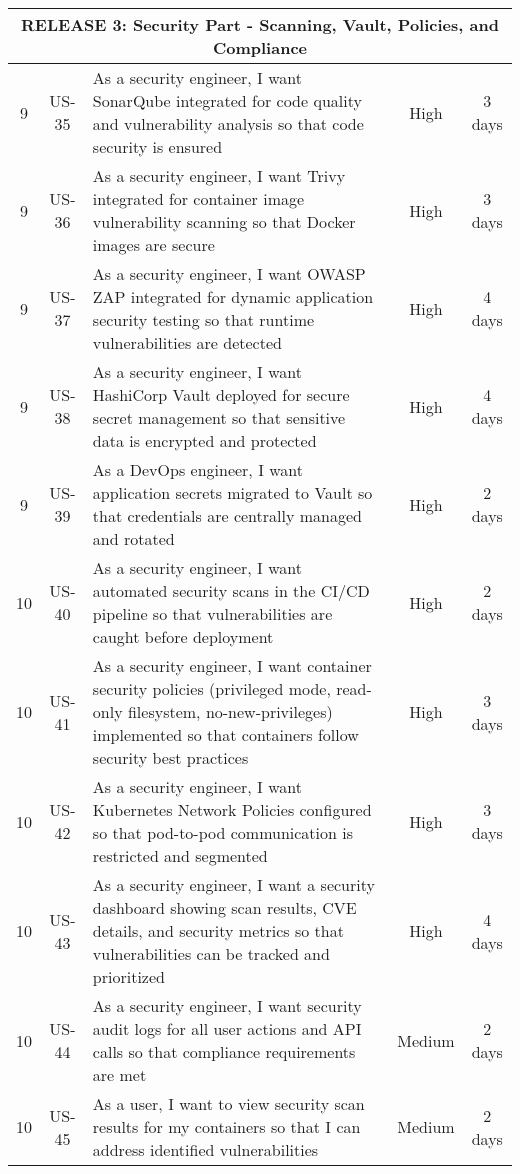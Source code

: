 \begin{longtable}{|c|c|p{8cm}|c|c|}
\multicolumn{5}{|c|}{\cellcolor{red!25}\textbf{RELEASE 3: Security Part - Scanning, Vault, Policies, and Compliance}} \\
\hline

9 & US-35 & As a security engineer, I want SonarQube integrated for code quality and vulnerability analysis so that code security is ensured & High & 3 days \\ \hline
9 & US-36 & As a security engineer, I want Trivy integrated for container image vulnerability scanning so that Docker images are secure & High & 3 days \\ \hline
9 & US-37 & As a security engineer, I want OWASP ZAP integrated for dynamic application security testing so that runtime vulnerabilities are detected & High & 4 days \\ \hline
9 & US-38 & As a security engineer, I want HashiCorp Vault deployed for secure secret management so that sensitive data is encrypted and protected & High & 4 days \\ \hline
9 & US-39 & As a DevOps engineer, I want application secrets migrated to Vault so that credentials are centrally managed and rotated & High & 2 days \\ \hline

10 & US-40 & As a security engineer, I want automated security scans in the CI/CD pipeline so that vulnerabilities are caught before deployment & High & 2 days \\ \hline
10 & US-41 & As a security engineer, I want container security policies (privileged mode, read-only filesystem, no-new-privileges) implemented so that containers follow security best practices & High & 3 days \\ \hline
10 & US-42 & As a security engineer, I want Kubernetes Network Policies configured so that pod-to-pod communication is restricted and segmented & High & 3 days \\ \hline
10 & US-43 & As a security engineer, I want a security dashboard showing scan results, CVE details, and security metrics so that vulnerabilities can be tracked and prioritized & High & 4 days \\ \hline
10 & US-44 & As a security engineer, I want security audit logs for all user actions and API calls so that compliance requirements are met & Medium & 2 days \\ \hline
10 & US-45 & As a user, I want to view security scan results for my containers so that I can address identified vulnerabilities & Medium & 2 days \\ \hline

\end{longtable}

